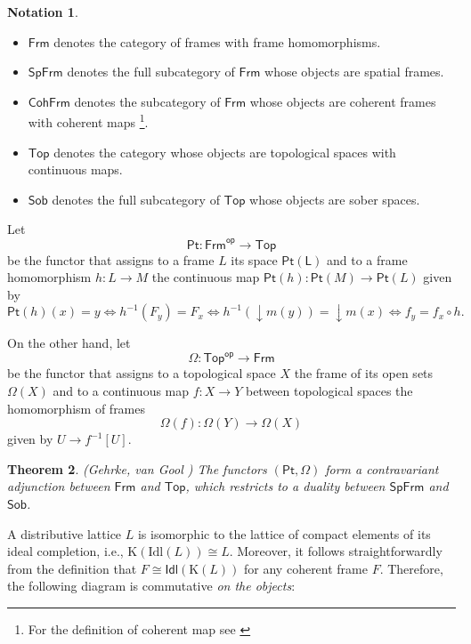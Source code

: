 \documentclass{article}
\theoremstyle{plain}
\newtheorem{theorem}{Theorem}[subsection]
\theoremstyle{definition}
\newtheorem{notation}[theorem]{Notation}
\theoremstyle{remark}
\newcommand{\bool}[1]{\mathsf{#1}}
\newcommand{\0}{\mathbbm 0}
\newcommand{\1}{\mathbbm 1}
\newcommand{\2}{\mathbbm 2}
\begin{document}
\begin{notation}
\label{not:Frm-Top}
\emph{}
\begin{itemize}
\item 
\label{not:Frm}
    $\bool{Frm}$ denotes the category of frames with  frame homomorphisms.
    \item 
\label{not:SpFrm}
    $\bool{SpFrm}$ denotes the full subcategory of \(\bool{Frm}\) whose objects are spatial frames.
    \item
    \label{not:CohFrm}
    $\bool{CohFrm}$ denotes the subcategory of \(\bool{Frm}\) whose objects are coherent frames with coherent maps \footnote{For the definition of coherent map see \cite{gehrke2024topological}}.
\item
\label{not:Top}
$\bool{Top}$ denotes the category whose objects are topological spaces with continuous maps.
    \item 
\label{not:Sob}
    $\bool{Sob}$ denotes the full subcategory of \(\bool{Top}\) whose objects are sober spaces.
\end{itemize}
\end{notation}


Let
    \[ \bool{Pt}: \bool{Frm}^{\bool{op}} \to \bool{Top} \]
    be the functor that assigns to a frame \(L\) its space \(\bool{Pt(L)}\) and to a frame homomorphism \( h: L \to M \) the continuous map \( \bool{Pt}(h): \bool{Pt}(M) \to \bool{Pt}(L) \) given by
    \[
    \bool{Pt}(h)(x) = y \iff h^{-1}(F_y) = F_x \iff h^{-1}(\downarrow m(y)) = \downarrow m(x) \iff f_y = f_x \circ h.
    \]

On the other hand, let 
 \[ \Omega: \bool{Top}^{\bool{op}} \to \bool{Frm} \]
be the functor that assigns to a topological space \(X\) the frame of its open sets \(\Omega(X)\) and to a continuous map \( f : X \to Y \) between 
 topological spaces the homomorphism of frames 
\[
\Omega(f): \Omega(Y) \to \Omega(X)
\]
given by \( U \to f^{-1}[U] \). 


\begin{theorem} (Gehrke, van Gool \cite[Thm. 6.13, Thm. 6.19]{gehrke2024topological})
    \label{thm:omega-ptduality}
    The functors \( (\bool{Pt}, \Omega) \) form a contravariant adjunction between \(\bool{Frm}\) and \(\bool{Top}\), which restricts to a duality between \(\bool{SpFrm}\) and \(\bool{Sob}\).
\end{theorem}




A distributive lattice $L$ is isomorphic to the lattice of compact elements of its ideal completion, i.e., \(\mathrm{K}(\mathrm{Idl}(L)) \cong L\). Moreover, it follows straightforwardly from the definition that \(F \cong \bool{Idl}(\mathrm{K}(L))\) for any coherent frame \(F\). Therefore, the following diagram  is commutative \emph{on the objects}:
\end{document}
